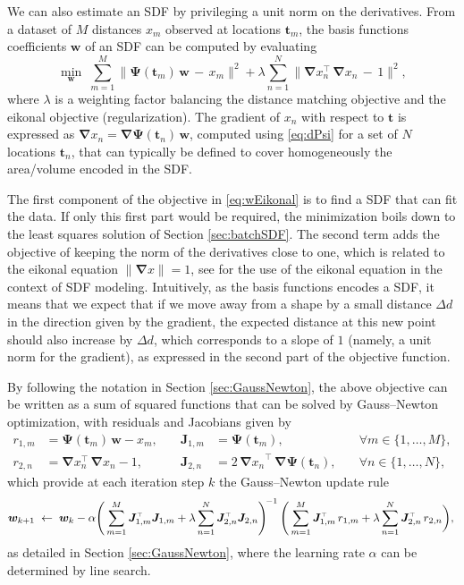 \documentclass[10pt,a4paper]{article} %
\newcommand{\trsp}{{\scriptscriptstyle\top}}
\begin{document}
We can also estimate an SDF by privileging a unit norm on the derivatives. From a dataset of $M$ distances $x_m$ observed at locations $\bm{t}_m$, the basis functions coefficients $\bm{w}$ of an SDF can be computed by evaluating 
\begin{equation}
	\min_{\bm{w}} \; \sum_{m=1}^M \big\|\bm{\Psi}(\bm{t}_m) \, \bm{w} \, - \, x_m\big\|^2 + 
	\lambda \sum_{n=1}^N \big\|\bm{\nabla}x_n^\trsp \, \bm{\nabla}x_n \, - \, 1 \big\|^2,
	\label{eq:wEikonal}
\end{equation}
where $\lambda$ is a weighting factor balancing the distance matching objective and the eikonal objective (regularization). The gradient of $x_n$ with respect to $\bm{t}$ is expressed as $\bm{\nabla}x_n = \bm{\nabla}\bm{\Psi}(\bm{t}_n) \, \bm{w}$, computed using \eqref{eq:dPsi} for a set of $N$ locations $\bm{t}_n$, that can typically be defined to cover homogeneously the area/volume encoded in the SDF. 

The first component of the objective in \eqref{eq:wEikonal} is to find a SDF that can fit the data. If only this first part would be required, the minimization boils down to the least squares solution of Section \ref{sec:batchSDF}. The second term adds the objective of keeping the norm of the derivatives close to one, which is related to the eikonal equation $\|\bm{\nabla}x\| =1$, see \cite{Gropp20} for the use of the eikonal equation in the context of SDF modeling. Intuitively, as the basis functions encodes a SDF, it means that we expect that if we move away from a shape by a small distance $\Delta d$ in the direction given by the gradient, the expected distance at this new point should also increase by $\Delta d$, which corresponds to a slope of $1$ (namely, a unit norm for the gradient), as expressed in the second part of the objective function.

By following the notation in Section \ref{sec:GaussNewton}, the above objective can be written as a sum of squared functions that can be solved by Gauss--Newton optimization, with residuals and Jacobians given by
\begin{align*}
	r_{1,m} &= \bm{\Psi}(\bm{t}_m) \, \bm{w} - x_m, 
	\quad &
	\bm{J}_{1,m} &= \bm{\Psi}(\bm{t}_m), 
	\quad &
	\forall m\in\{1,\ldots,M\}, 
	\\
	r_{2,n} &= \bm{\nabla}x_n^\trsp \, \bm{\nabla}x_n - 1, 
	\quad & 
	\bm{J}_{2,n} &= 2 \, {\bm{\nabla}x_n}^{\!\trsp} \, \bm{\nabla}\bm{\Psi}(\bm{t}_n), 
	\quad &
	\forall n\in\{1,\ldots,N\},
\end{align*}
which provide at each iteration step $k$ the Gauss--Newton update rule
\begin{equation*}
	\bm{w}_{k+1} \;\leftarrow\; 
	\bm{w}_k - \alpha {\Bigg( \sum_{m=1}^M \bm{J}_{1,m}^\trsp \bm{J}_{1,m} + \lambda \sum_{n=1}^N \bm{J}_{2,n}^\trsp \bm{J}_{2,n} \Bigg)}^{\!-1} \, 
	\Bigg( \sum_{m=1}^M \bm{J}_{1,m}^\trsp \, r_{1,m} + \lambda \sum_{n=1}^N \bm{J}_{2,n}^\trsp \, r_{2,n} \bigg),\\
\end{equation*}
as detailed in Section \ref{sec:GaussNewton}, where the learning rate $\alpha$ can be determined by line search.
\end{document}
